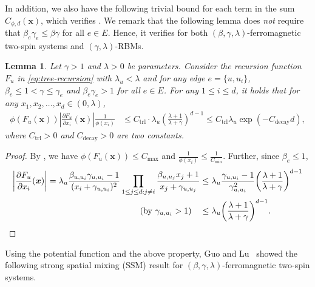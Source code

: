 \documentclass[11pt]{amsart}
\newcommand{\tp}[1]{{\left( #1 \right)}}
\newcommand{\abs}[1]{\ensuremath{\left\vert#1\right\vert}}
\newtheorem{lemma}[theorem]{Lemma}
\theoremstyle{definition}
\theoremstyle{remark}
\begin{document}
    In addition, we also have the following trivial bound for each term in the sum $C_{\phi,d}(\boldsymbol{x})$, which verifies . We remark that the following lemma does \emph{not} require that $\beta_e\gamma_e \leq \beta \gamma$ for all $e \in E$. Hence, it verifies  for both $(\beta,\gamma,\lambda)$-ferromagnetic two-spin systems and $(\gamma,\lambda)$-RBMs.

    \begin{lemma}\label{lemma:trivial-bound-for-C-ver}
        Let $\gamma > 1$ and $\lambda > 0$ be parameters.
        Consider the recursion function $F_u$ in \eqref{eq:tree-recursion} with $\lambda_u < \lambda$ and for any edge $e = \{u,u_i\}$, $\beta_e \leq 1 < \gamma \leq \gamma_e$ and $\beta_e\gamma_e > 1$ for all $e \in E$. For any $1\leq i \leq d$, it holds that for any $x_1,x_2,\ldots,x_d \in (0, \lambda)$,
    \begin{align*}
        \phi(F_u(\boldsymbol{x})) \left\vert  \frac{\partial F_u}{\partial x_i}(\boldsymbol{x})  \right\vert \frac{1}{\phi(x_i)} &\leq C_{\text{trl}} \cdot  \lambda_u  \tp{\frac{\lambda + 1}{\lambda + \gamma}}^{d-1}
        \leq C_{\text{trl}} \lambda_u \exp(-C_{\text{decay}} d),
    \end{align*}
    where $C_{\text{trl}} > 0$ and $C_{\text{decay}}  > 0$ are two constants.
    \end{lemma}
    \begin{proof}
    By , we have $\phi(F_u(\boldsymbol{x})) \leq C_{\max}$ and $\frac{1}{\phi(x_i)} \leq \frac{1}{C_{\min}}$. Further, since $\beta_e \leq 1$, 
    \begin{align*}
     \abs{\frac{\partial F_u}{\partial x_i}(\boldsymbol{x})} = \lambda_u \frac{\beta_{u,u_i}\gamma_{u,u_i} - 1}{(x_i + \gamma_{u,u_i})^2} \prod_{1 \leq j \leq d: j \neq i} \frac{\beta_{u,u_j} x_j +1}{x_j+\gamma_{u,u_j}} &\leq \lambda_u \frac{\gamma_{u,u_i} - 1}{\gamma_{u,u_i}^2} \tp{\frac{\lambda + 1}{\lambda + \gamma}}^{d-1}\\
     \text{(by $\gamma_{u,u_i} > 1$)}\quad &\leq \lambda_u \tp{\frac{\lambda + 1}{\lambda + \gamma}}^{d-1}. \qedhere
    \end{align*}
    \end{proof}

    Using the potential function and the above property, Guo and Lu~\cite{GuoL18} showed the following strong spatial mixing (SSM) result for $(\beta,\gamma,\lambda)$-ferromagnetic two-spin systems.
\end{document}
